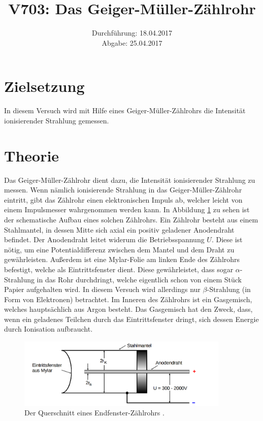 \documentclass[
  bibliography=totoc,     %
  captions=tableheading,  %
  titlepage=firstiscover, %
]{scrartcl}
\title{V703: Das Geiger-Müller-Zählrohr}
\author{
  Simon Schulte
  \texorpdfstring{
    \\
    \href{mailto:simon.schulte@udo.edu}{simon.schulte@udo.edu}
  }{}
  \texorpdfstring{\and}{, }
  Tim Sedlaczek
  \texorpdfstring{
    \\
    \href{mailto:tim.sedlaczek@udo.edu}{tim.sedlaczek@udo.edu}
  }{}
}
\date{Durchführung: 18.04.2017\\
      Abgabe: 25.04.2017}
\begin{document}
\maketitle
\thispagestyle{empty}
\tableofcontents
\newpage
\setcounter{page}{1}
\section{Zielsetzung}
\label{sec:zielsetzung}
In diesem Versuch wird mit Hilfe eines Geiger-Müller-Zählrohrs die Intensität
ionisierender Strahlung gemessen.
\section{Theorie}
\label{sec:theorie}
Das Geiger-Müller-Zählrohr dient dazu, die Intensität ionisierender Strahlung
zu messen. Wenn nämlich ionisierende Strahlung in das Geiger-Müller-Zählrohr
eintritt, gibt das Zählrohr einen elektronischen Impuls ab, welcher leicht von
einem Impulsmesser wahrgenommen werden kann.
In Abbildung \ref{fig:V7031} zu sehen ist der schematische Aufbau eines
solchen Zählrohrs. Ein Zählrohr besteht aus einem Stahlmantel, in dessen
Mitte sich axial ein positiv geladener Anodendraht befindet. Der Anodendraht
leitet widerum die Betriebsspannung $U$. Diese ist nötig, um eine
Potentialdifferenz zwischen dem Mantel und dem Draht zu gewährleisten. Außerdem
ist eine Mylar-Folie am linken Ende des Zählrohrs befestigt, welche als
Eintrittsfenster dient. Diese gewährleistet, dass sogar $\alpha$-Strahlung in
das Rohr durchdringt, welche eigentlich schon von einem Stück Papier aufgehalten
wird. In diesem Versuch wird allerdings nur $\beta$-Strahlung (in Form von Elektronen)
betrachtet. Im Inneren des Zählrohrs ist ein Gasgemisch, welches hauptsächlich aus
Argon besteht. Das Gasgemisch hat den Zweck, dass, wenn ein geladenes Teilchen durch
das Eintrittsfenster dringt, sich dessen Energie durch Ionisation aufbraucht.
\begin{figure}[htb]
  \centering
  \includegraphics[width=0.9\textwidth]{V7031.png}
  \caption{Der Querschnitt eines Endfenster-Zählrohrs \cite{anleitung}.}
  \label{fig:V7031}
\end{figure}
\end{document}

